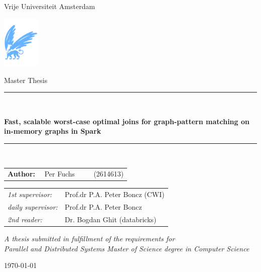 \documentclass[11pt]{article}
\title{
}
\author{}
\date{}
\begin{document}
  \thispagestyle{empty}

  \begin{center}

    Vrije Universiteit Amsterdam

    \vspace{1mm}

    \includegraphics[height=25mm]{figures/vu-griffioen.pdf}

    \vspace{1cm}

    {\Large Master Thesis}

    \vspace*{1.5cm}

    \rule{.9\linewidth}{.6pt}\\[0.4cm]
    {\Large \bfseries Fast, scalable worst-case optimal joins for graph-pattern matching on in-memory graphs in Spark\par}\vspace{0.4cm}
    \rule{.9\linewidth}{.6pt}\\[1.5cm]

    \vspace*{2mm}

    {\Large
    \begin{tabular}{l}
    {\bf Author:} ~~Per Fuchs ~~~~ (2614613)
    \end{tabular}
    }

    \vspace*{2cm}

    \begin{tabular}{ll}
    {\it 1st supervisor:}   & Prof.dr P.A. Peter Boncz (CWI) \\
    {\it daily supervisor:} & Prof.dr P.A. Peter Boncz  \\
    {\it 2nd reader:}       & Dr. Bogdan Ghit (databricks)
    \end{tabular}

    \vspace*{2.5cm}

    \textit{A thesis submitted in fulfillment of the requirements for\\ Parallel and Distributed Systems Master of Science degree in
    Computer Science}


    \today %

  \end{center}
  \newpage
\maketitle
\end{document}
